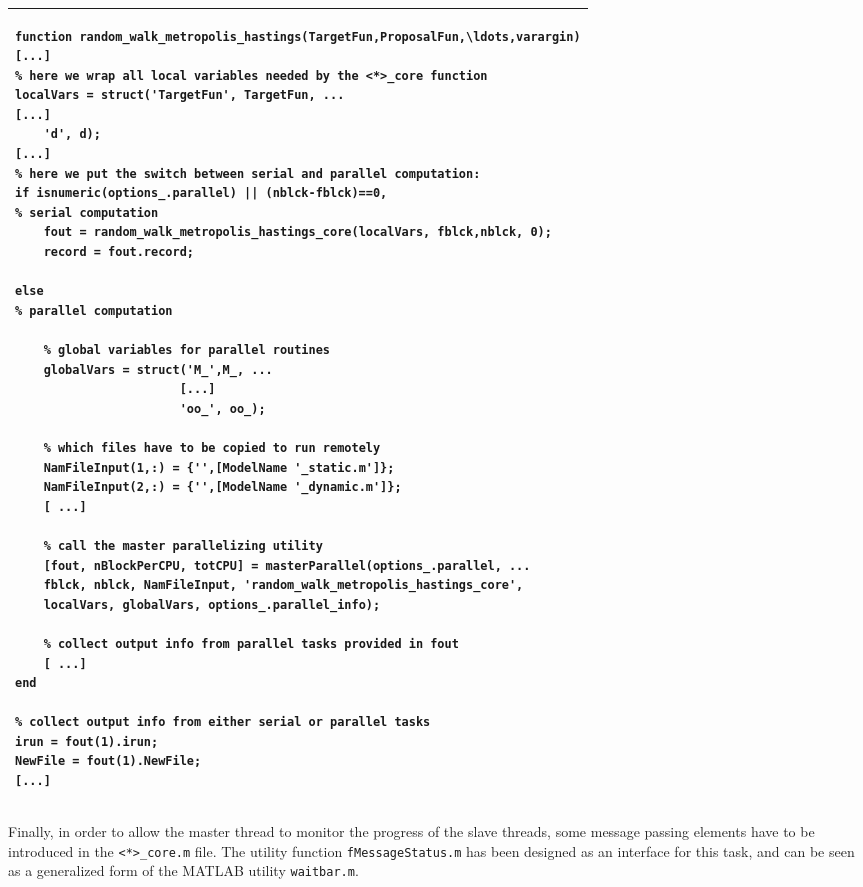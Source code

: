 \documentclass[12pt,a4paper,pdftex]{article}
\begin{document}
\singlespacing
{\footnotesize
\noindent\begin{tabular}[b]{| p{\linewidth} |}
\hline
\begin{verbatim}
function random_walk_metropolis_hastings(TargetFun,ProposalFun,\ldots,varargin)
[...]
% here we wrap all local variables needed by the <*>_core function
localVars = struct('TargetFun', TargetFun, ...
[...]
    'd', d);
[...]
% here we put the switch between serial and parallel computation:
if isnumeric(options_.parallel) || (nblck-fblck)==0,
% serial computation
    fout = random_walk_metropolis_hastings_core(localVars, fblck,nblck, 0);
    record = fout.record;

else
% parallel computation

    % global variables for parallel routines
    globalVars = struct('M_',M_, ...
                       [...]
                       'oo_', oo_);

    % which files have to be copied to run remotely
    NamFileInput(1,:) = {'',[ModelName '_static.m']};
    NamFileInput(2,:) = {'',[ModelName '_dynamic.m']};
    [ ...]

    % call the master parallelizing utility
    [fout, nBlockPerCPU, totCPU] = masterParallel(options_.parallel, ...
    fblck, nblck, NamFileInput, 'random_walk_metropolis_hastings_core',
    localVars, globalVars, options_.parallel_info);

    % collect output info from parallel tasks provided in fout
    [ ...]
end

% collect output info from either serial or parallel tasks
irun = fout(1).irun;
NewFile = fout(1).NewFile;
[...]
\end{verbatim}
\\ \hline
\end{tabular}
}
\doublespacing

Finally, in order to allow the master thread to monitor the progress of the slave threads, some message passing elements have to be introduced in the \verb"<*>_core.m" file. The utility function \verb"fMessageStatus.m" has been  designed as an interface for this task, and can be seen as a generalized form of the MATLAB utility \verb"waitbar.m".
\end{document}

